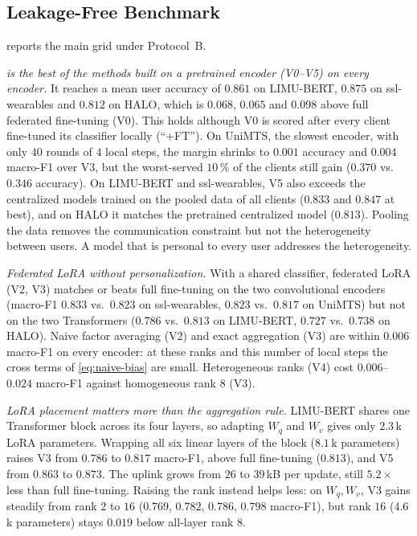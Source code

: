 \subsection{Leakage-Free Benchmark}\label{sec:results:main}

 reports the main grid under Protocol~B.

\emph{\method{} is the best of the methods built on a pretrained encoder (V0--V5) on every encoder.}
It reaches a mean user accuracy of $0.861$ on LIMU-BERT, $0.875$ on ssl-wearables and $0.812$ on HALO,
which is $0.068$, $0.065$ and $0.098$ above full federated fine-tuning (V0). This holds although V0 is
scored after every client fine-tuned its classifier locally (``+FT''). On UniMTS, the slowest encoder,
with only $40$ rounds of $4$ local steps, the margin shrinks to $0.001$ accuracy and $0.004$ macro-F1
over V3, but the worst-served $10\,\%$ of the clients still gain ($0.370$ vs.\ $0.346$ accuracy). On LIMU-BERT
and ssl-wearables, V5 also exceeds the centralized models trained on the pooled data of all clients
($0.833$ and $0.847$ at best), and on HALO it matches the pretrained centralized model ($0.813$). Pooling
the data removes the communication constraint but not the heterogeneity between users. A model that is
personal to every user addresses the heterogeneity.

\emph{Federated LoRA without personalization.} With a shared classifier, federated LoRA (V2, V3)
matches or beats full fine-tuning on the two convolutional encoders (macro-F1 $0.833$ vs.\ $0.823$ on
ssl-wearables, $0.823$ vs.\ $0.817$ on UniMTS) but not on the two Transformers ($0.786$ vs.\ $0.813$ on
LIMU-BERT, $0.727$ vs.\ $0.738$ on HALO). Naive factor averaging (V2) and exact aggregation (V3) are
within $0.006$ macro-F1 on every encoder: at these ranks and this number of local steps the cross
terms of \cref{eq:naive-bias} are small. Heterogeneous ranks (V4) cost $0.006$--$0.024$ macro-F1
against homogeneous rank $8$ (V3).

\emph{LoRA placement matters more than the aggregation rule.} LIMU-BERT shares one Transformer block
across its four layers, so adapting $W_q$ and $W_v$ gives only $2.3$\,k LoRA parameters. Wrapping all
six linear layers of the block ($8.1$\,k parameters) raises V3 from $0.786$ to $0.817$ macro-F1, above
full fine-tuning ($0.813$), and V5 from $0.863$ to $0.873$. The uplink grows from $26$ to $39$\,kB per
update, still $5.2\times$ less than full fine-tuning. Raising the rank instead helps less: on $W_q,W_v$,
V3 gains steadily from rank $2$ to $16$ ($0.769$, $0.782$, $0.786$, $0.798$ macro-F1), but rank $16$
($4.6$\,k parameters) stays $0.019$ below all-layer rank $8$.

